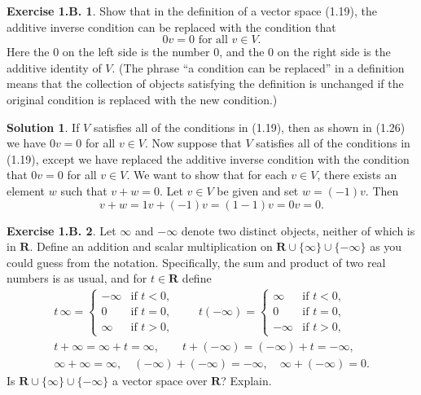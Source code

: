 \documentclass[12pt]{article}
\theoremstyle{definition}
\theoremstyle{exercise}
\newtheorem{exercise}{Exercise 1.B.}
\theoremstyle{solution}
\newtheorem*{solution}{Solution}
\newcommand{\R}{\mathbf{R}}
\begin{document}
\begin{exercise}
\label{ex:5}
    Show that in the definition of a vector space (1.19), the additive inverse condition can be replaced with the condition that
    \[
        0v = 0 \text{ for all } v \in V.
    \]
    Here the \( 0 \) on the left side is the number \( 0 \), and the \( 0 \) on the right side is the additive identity of \( V \). (The phrase ``a condition can be replaced'' in a definition means that the collection of objects satisfying the definition is unchanged if the original condition is replaced with the new condition.)
\end{exercise}

\begin{solution}
    If \( V \) satisfies all of the conditions in (1.19), then as shown in (1.26) we have \( 0v = 0 \) for all \( v \in V \). Now suppose that \( V \) satisfies all of the conditions in (1.19), except we have replaced the additive inverse condition with the condition that \( 0v = 0 \) for all \( v \in V \). We want to show that for each \( v \in V \), there exists an element \( w \) such that \( v + w = 0 \). Let \( v \in V \) be given and set \( w = (-1)v \). Then
    \[
        v + w = 1v + (-1)v = (1 - 1)v = 0v = 0.
    \]
\end{solution}

\begin{exercise}
\label{ex:6}
    Let \( \infty \) and \( -\infty \) denote two distinct objects, neither of which is in \( \R \). Define an addition and scalar multiplication on \( \R \cup \{ \infty \} \cup \{ -\infty \} \) as you could guess from the notation. Specifically, the sum and product of two real numbers is as usual, and for \( t \in \R \) define
    \begin{gather*}
        t \, \infty = \begin{cases}
            -\infty & \text{if } t < 0, \\
            0 & \text{if } t = 0, \\
            \infty & \text{if } t > 0,
        \end{cases}
        \qquad
        t (-\infty) = \begin{cases}
            \infty & \text{if } t < 0, \\
            0 & \text{if } t = 0, \\
            -\infty & \text{if } t > 0,
        \end{cases} \\
        t + \infty = \infty + t = \infty, \qquad t + (-\infty) = (-\infty) + t = -\infty, \\
        \infty + \infty = \infty, \quad (-\infty) + (-\infty) = -\infty, \quad \infty + (-\infty) = 0.
    \end{gather*}
    Is \( \R \cup \{ \infty \} \cup \{ -\infty \} \) a vector space over \( \R \)? Explain.
\end{exercise}
\end{document}
